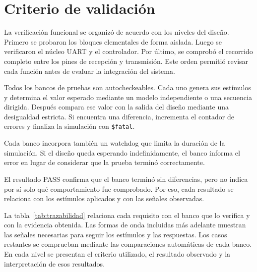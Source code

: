 \section{Criterio de validación}

La verificación funcional se organizó de acuerdo con los niveles del
diseño. Primero se probaron los bloques elementales de forma aislada.
Luego se verificaron el núcleo UART y el controlador. Por último, se
comprobó el recorrido completo entre los pines de recepción y
transmisión. Este orden permitió revisar cada función antes de
evaluar la integración del sistema.

Todos los bancos de pruebas son autocheckeables. Cada uno genera sus
estímulos y determina el valor esperado mediante un modelo
independiente o una secuencia dirigida. Después compara ese valor con
la salida del diseño mediante una desigualdad estricta. Si encuentra
una diferencia, incrementa el contador de errores y finaliza la
simulación con \texttt{\$fatal}.

Cada banco incorpora también un watchdog que limita la duración de la
simulación. Si el diseño queda esperando indefinidamente, el banco
informa el error en lugar de considerar que la prueba terminó correctamente.

El resultado PASS confirma que el banco terminó sin diferencias, pero
no indica por sí solo qué comportamiento fue comprobado. Por eso,
cada resultado se relaciona con los estímulos aplicados y con las
señales observadas.

La tabla~\ref{tab:trazabilidad} relaciona cada requisito con el banco
que lo verifica y con la evidencia obtenida. Las formas de onda
incluidas más adelante muestran las señales necesarias para seguir
los estímulos y las respuestas. Los casos restantes se comprueban
mediante las comparaciones automáticas de cada banco. En cada nivel
se presentan el criterio utilizado, el resultado observado y la
interpretación de esos resultados.

